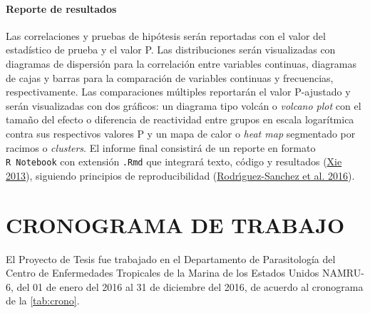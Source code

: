 \documentclass[
  a4paper]{article}
\begin{document}
\hypertarget{reporte-de-resultados}{%
\paragraph{Reporte de resultados}\label{reporte-de-resultados}}

Las correlaciones y pruebas de hipótesis serán reportadas con el valor
del estadístico de prueba y el valor P. Las distribuciones serán
visualizadas con diagramas de dispersión para la correlación entre
variables continuas, diagramas de cajas y barras para la comparación de
variables continuas y frecuencias, respectivamente. Las comparaciones
múltiples reportarán el valor P-ajustado y serán visualizadas con dos
gráficos: un diagrama tipo volcán o \emph{volcano plot} con el tamaño
del efecto o diferencia de reactividad entre grupos en escala
logarítmica contra sus respectivos valores P y un mapa de calor o
\emph{heat map} segmentado por racimos o \emph{clusters}. El informe
final consistirá de un reporte en formato \texttt{R\ Notebook} con
extensión \texttt{.Rmd} que integrará texto, código y resultados
(\protect\hyperlink{ref-knitr}{Xie 2013}), siguiendo principios de
reproducibilidad
(\protect\hyperlink{ref-CienciaReproducible2016}{Rodrı́guez-Sanchez et
al. 2016}).

\hypertarget{cronograma-de-trabajo}{%
\section{CRONOGRAMA DE TRABAJO}\label{cronograma-de-trabajo}}

El Proyecto de Tesis fue trabajado en el Departamento de Parasitología
del Centro de Enfermedades Tropicales de la Marina de los Estados Unidos
NAMRU-6, del 01 de enero del 2016 al 31 de diciembre del 2016, de
acuerdo al cronograma de la \autoref{tab:crono}.
\end{document}
